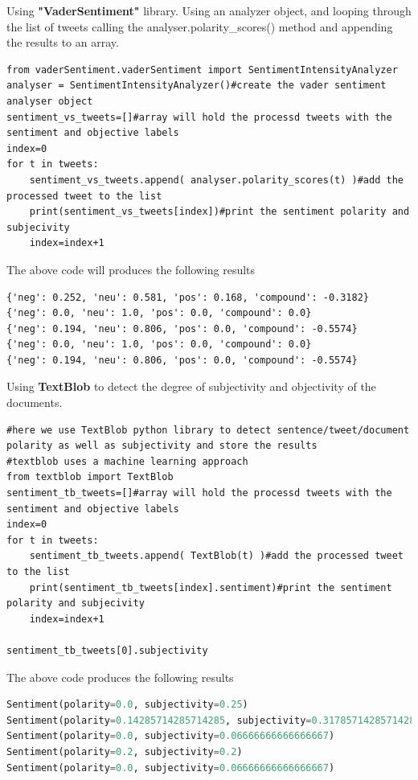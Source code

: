 Using \textbf{"VaderSentiment"} library. Using an analyzer object, and looping through the list of tweets  calling the analyser.polarity\_scores() method and appending the results to an array.

\begin{lstlisting}
from vaderSentiment.vaderSentiment import SentimentIntensityAnalyzer
analyser = SentimentIntensityAnalyzer()#create the vader sentiment analyser object
sentiment_vs_tweets=[]#array will hold the processd tweets with the sentiment and objective labels
index=0
for t in tweets:
    sentiment_vs_tweets.append( analyser.polarity_scores(t) )#add the processed tweet to the list
    print(sentiment_vs_tweets[index])#print the sentiment polarity and subjecivity
    index=index+1
\end{lstlisting}


The above code will produces the following results

\begin{lstlisting}
{'neg': 0.252, 'neu': 0.581, 'pos': 0.168, 'compound': -0.3182}
{'neg': 0.0, 'neu': 1.0, 'pos': 0.0, 'compound': 0.0}
{'neg': 0.194, 'neu': 0.806, 'pos': 0.0, 'compound': -0.5574}
{'neg': 0.0, 'neu': 1.0, 'pos': 0.0, 'compound': 0.0}
{'neg': 0.194, 'neu': 0.806, 'pos': 0.0, 'compound': -0.5574}
\end{lstlisting}




Using \textbf{TextBlob} to detect the degree of subjectivity and objectivity of the documents.


\begin{lstlisting}
#here we use TextBlob python library to detect sentence/tweet/document polarity as well as subjectivity and store the results
#textblob uses a machine learning approach
from textblob import TextBlob
sentiment_tb_tweets=[]#array will hold the processd tweets with the sentiment and objective labels
index=0
for t in tweets:
    sentiment_tb_tweets.append( TextBlob(t) )#add the processed tweet to the list
    print(sentiment_tb_tweets[index].sentiment)#print the sentiment polarity and subjecivity
    index=index+1
    
sentiment_tb_tweets[0].subjectivity
\end{lstlisting}


The above code produces the following results


\begin{lstlisting}[language=Python]
Sentiment(polarity=0.0, subjectivity=0.25)
Sentiment(polarity=0.14285714285714285, subjectivity=0.31785714285714284)
Sentiment(polarity=0.0, subjectivity=0.06666666666666667)
Sentiment(polarity=0.2, subjectivity=0.2)
Sentiment(polarity=0.0, subjectivity=0.06666666666666667)
\end{lstlisting}

